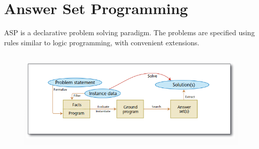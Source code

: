 \documentclass[10pt,a4paper]{report}
\begin{document}
\chapter{Answer Set Programming}
ASP is a declarative problem solving paradigm. The problems are specified using rules similar to logic programming, with convenient extensions.
\begin{figure}[H]
    \centering
    \includegraphics[scale=0.5]{42.png}
\end{figure}
\end{document}
